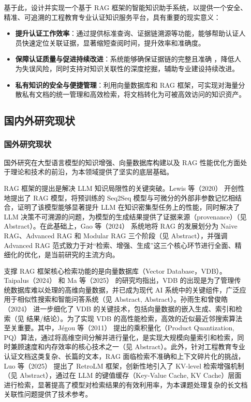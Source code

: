 \documentclass[UTF8,a4paper,zihao=-4]{ctexart}
\begin{document}
基于此，设计并实现一个基于 RAG 框架的智能知识助手系统，以提供一个安全、精准、可追溯的工程教育专业认证知识服务平台，具有重要的现实意义：
\begin{itemize}
    \item \textbf{提升认证工作效率}：通过提供标准查询、证据链溯源等功能，能够帮助认证人员快速定位关联证据，显著缩短查阅时间，提升效率和准确度。
    \item \textbf{保障认证质量与促进持续改进}：系统能够确保证据链的完整且准确 \cite{lj__2015}，降低人为失误风险，同时支持对知识关联性的深度挖掘，辅助专业建设持续改进。
    \item \textbf{私有知识的安全与便捷管理}：利用向量数据库和 RAG 框架，可实现对海量分散私有文档的统一管理和高效检索，将文档转化为可被高效访问的知识资产。
\end{itemize}

\subsection{国内外研究现状}

\subsubsection{国外研究现状}
国外研究在大型语言模型的知识增强、向量数据库构建以及 RAG 性能优化方面处于理论和技术的前沿，为本领域提供了坚实的底层基础。

RAG 框架的提出是解决 LLM 知识局限性的关键突破。Lewis 等（2020）\cite{lewis_retrieval-augmented_2021} 开创性地提出了 RAG 模型，将预训练的 Seq2Seq 模型与可微分的外部非参数记忆相结合，证明了该模型能够显著提升 LLM 在知识密集型任务上的性能，同时解决了 LLM 决策不可溯源的问题，为模型的生成结果提供了证据来源（provenance）（见 \cite{lewis_retrieval-augmented_2021} Abstract）。在此基础上，Gao 等（2024）\cite{gao_retrieval-augmented_2024} 系统地将 RAG 的发展划分为 Naive RAG、Advanced RAG 和 Modular RAG 三个阶段（见 \cite{gao_retrieval-augmented_2024} Abstract），并强调 Advanced RAG 范式致力于对“检索、增强、生成”这三个核心环节进行全面、精细化的优化，是当前研究的主流方向。

支撑 RAG 框架核心检索功能的是向量数据库（Vector Database，VDB）。Taipalus（2024）\cite{taipalus_vector_2024} 和 Ma 等（2025）\cite{ma_comprehensive_2025} 的研究均指出，VDB 的出现是为了管理传统数据库难以处理的高维向量数据，并已成为现代 AI 系统中的关键组件，广泛应用于相似性搜索和智能问答系统（见 \cite{taipalus_vector_2024} Abstract, \cite{ma_comprehensive_2025} Abstract）。孙雨生和曾俊皓（2024）\cite{sys_rag} 进一步细化了 VDB 的关键技术，包括向量数据的嵌入生成、索引和检索（见 \cite{sys_rag} 结果/结论）。为了实现 VDB 的高性能检索，高效的近似最近邻搜索算法至关重要。其中，Jégou 等（2011）\cite{jegou_product_2011} 提出的乘积量化（Product Quantization, PQ）算法，通过将高维空间分解并进行量化，是实现大规模向量索引和检索，同时兼顾速度和内存效率的核心技术之一（见 \cite{jegou_product_2011} Abstract）。此外，针对工程教育专业认证文档这类复杂、长篇的文本，RAG 面临检索不准确和上下文碎片化的挑战，Luo 等（2025）\cite{luo_does_2025} 提出了 RetroLM 框架，创新性地引入了 KV-level 检索增强机制（见 \cite{luo_does_2025} Abstract），通过在 LLM 的键值缓存（Key-Value Cache, KV Cache）层面进行检索，显著提高了模型对检索结果的有效利用率，为本课题处理复杂的长文档关联性问题提供了技术参考。
\end{document}
